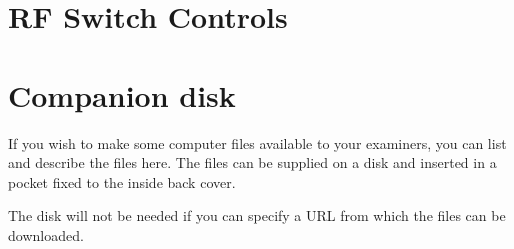 \documentclass[12pt,openany,a4paper]{book}
\begin{document}
\chapter{RF Switch Controls}







\chapter{Companion disk}

If you wish to make some computer files available to your examiners,
you can list and describe the files here.  The files can be supplied
on a disk and inserted in a pocket fixed to the inside back cover.

The disk will not be needed if you can specify a URL from which the
files can be downloaded.

\cleardoublepage











\end{document}

